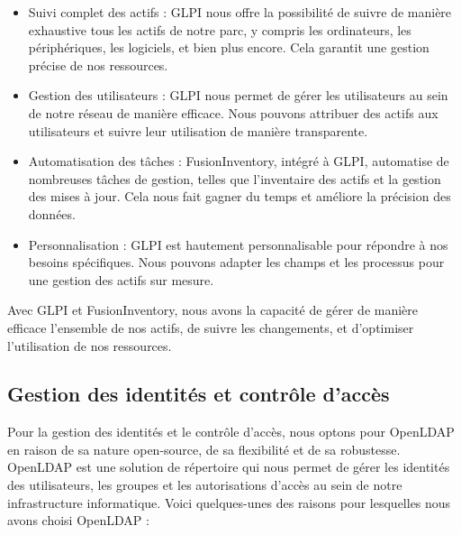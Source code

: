 \begin{itemize}

\item Suivi complet des actifs : GLPI nous offre la possibilité de suivre de manière exhaustive tous les actifs de notre parc, y compris les ordinateurs, les périphériques, les logiciels, et bien plus encore. Cela garantit une gestion précise de nos ressources.\\

\item Gestion des utilisateurs : GLPI nous permet de gérer les utilisateurs au sein de notre réseau de manière efficace. Nous pouvons attribuer des actifs aux utilisateurs et suivre leur utilisation de manière transparente.\\

\item Automatisation des tâches : FusionInventory, intégré à GLPI, automatise de nombreuses tâches de gestion, telles que l'inventaire des actifs et la gestion des mises à jour. Cela nous fait gagner du temps et améliore la précision des données.\\

\item Personnalisation : GLPI est hautement personnalisable pour répondre à nos besoins spécifiques. Nous pouvons adapter les champs et les processus pour une gestion des actifs sur mesure.\\

\end{itemize}

Avec GLPI et FusionInventory, nous avons la capacité de gérer de manière efficace l'ensemble de nos actifs, de suivre les changements, et d'optimiser l'utilisation de nos ressources.\\




\subsection{Gestion des identités et contrôle d'accès}

Pour la gestion des identités et le contrôle d'accès, nous optons pour OpenLDAP en raison de sa nature open-source, de sa flexibilité et de sa robustesse. OpenLDAP est une solution de répertoire qui nous permet de gérer les identités des utilisateurs, les groupes et les autorisations d'accès au sein de notre infrastructure informatique. Voici quelques-unes des raisons pour lesquelles nous avons choisi OpenLDAP :\\

